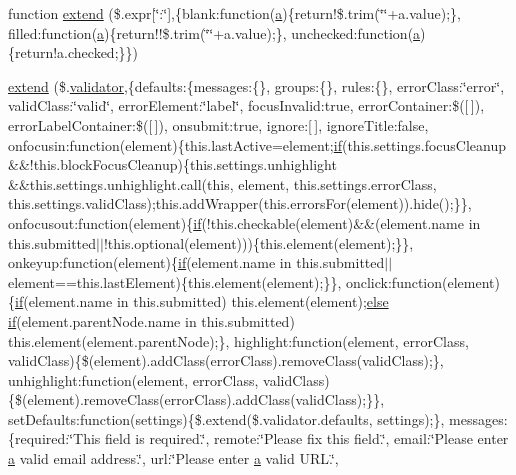 \begin{DoxyCompactItemize}
\item 
function \hyperlink{jquery_8validate-vsdoc_8js_a08553879d4a764e75170d547d37bd35f}{extend} (\$.expr\mbox{[}\char`\"{}\+:\char`\"{}\mbox{]},\{blank\+:function(\hyperlink{_scripts_2bootstrap_8min_8js_a7318f59fb86a4437995ee89c780c51ac}{a})\{return!\$.\+trim(\char`\"{}\char`\"{}+a.\+value);\}, filled\+:function(\hyperlink{_scripts_2bootstrap_8min_8js_a7318f59fb86a4437995ee89c780c51ac}{a})\{return!!\$.\+trim(\char`\"{}\char`\"{}+a.\+value);\}, unchecked\+:function(\hyperlink{_scripts_2bootstrap_8min_8js_a7318f59fb86a4437995ee89c780c51ac}{a})\{return!a.\+checked;\}\})
\item 
\hyperlink{jquery_8validate-vsdoc_8js_a90e79f9be522c7080924ad4ceb3efefe}{extend} (\$.\hyperlink{_scripts_2jquery_8validate_8js_a2dc8272bb221cdffcccbd20db038f172}{validator},\{defaults\+:\{messages\+:\{\}, groups\+:\{\}, rules\+:\{\}, error\+Class\+:\char`\"{}error\char`\"{}, valid\+Class\+:\char`\"{}valid\char`\"{}, error\+Element\+:\char`\"{}label\char`\"{}, focus\+Invalid\+:true, error\+Container\+:\$(\mbox{[}$\,$\mbox{]}), error\+Label\+Container\+:\$(\mbox{[}$\,$\mbox{]}), onsubmit\+:true, ignore\+:\mbox{[}$\,$\mbox{]}, ignore\+Title\+:false, onfocusin\+:function(element)\{this.\+last\+Active=element;\hyperlink{_scripts_2respond_8min_8js_a93851d60dd037a83509a1757b9ee7b66}{if}(this.\+settings.\+focus\+Cleanup \&\&!this.\+block\+Focus\+Cleanup)\{this.\+settings.\+unhighlight \&\&this.\+settings.\+unhighlight.\+call(this, element, this.\+settings.\+error\+Class, this.\+settings.\+valid\+Class);this.\+add\+Wrapper(this.\+errors\+For(element)).hide();\}\}, onfocusout\+:function(element)\{\hyperlink{_scripts_2respond_8min_8js_a93851d60dd037a83509a1757b9ee7b66}{if}(!this.\+checkable(element)\&\&(element.\+name in this.\+submitted$\vert$$\vert$!this.\+optional(element)))\{this.\+element(element);\}\}, onkeyup\+:function(element)\{\hyperlink{_scripts_2respond_8min_8js_a93851d60dd037a83509a1757b9ee7b66}{if}(element.\+name in this.\+submitted$\vert$$\vert$element==this.\+last\+Element)\{this.\+element(element);\}\}, onclick\+:function(element)\{\hyperlink{_scripts_2respond_8min_8js_a93851d60dd037a83509a1757b9ee7b66}{if}(element.\+name in this.\+submitted) this.\+element(element);\hyperlink{_scripts_2jquery_8validate_8js_a0544c3fe466e421738dae463968b70ba}{else} \hyperlink{_scripts_2respond_8min_8js_a93851d60dd037a83509a1757b9ee7b66}{if}(element.\+parent\+Node.\+name in this.\+submitted) this.\+element(element.\+parent\+Node);\}, highlight\+:function(element, error\+Class, valid\+Class)\{\$(element).add\+Class(error\+Class).remove\+Class(valid\+Class);\}, unhighlight\+:function(element, error\+Class, valid\+Class)\{\$(element).remove\+Class(error\+Class).add\+Class(valid\+Class);\}\}, set\+Defaults\+:function(settings)\{\$.extend(\$.validator.\+defaults, settings);\}, messages\+:\{required\+:\char`\"{}This field is required.\char`\"{}, remote\+:\char`\"{}Please fix this field.\char`\"{}, email\+:\char`\"{}Please enter \hyperlink{_scripts_2bootstrap_8min_8js_a7318f59fb86a4437995ee89c780c51ac}{a} valid email address.\char`\"{}, url\+:\char`\"{}Please enter \hyperlink{_scripts_2bootstrap_8min_8js_a7318f59fb86a4437995ee89c780c51ac}{a} valid U\+R\+L.\char`\"{}, 
\end{DoxyCompactItemize}

